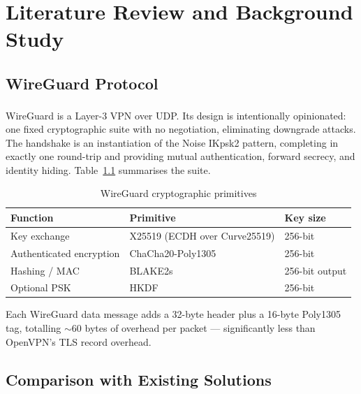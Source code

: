 \documentclass[12pt,a4paper]{report}
\newcommand{\wireguard}{WireGuard\textsuperscript{\textregistered}}
\begin{document}
\chapter{Literature Review and Background Study}

\section{WireGuard Protocol}

\wireguard{} \cite{donenfeld2017wireguard,wireguard_whitepaper} is a Layer-3 VPN over UDP. Its design is intentionally opinionated: one fixed cryptographic suite with no negotiation, eliminating downgrade attacks. The handshake is an instantiation of the Noise IKpsk2 pattern, completing in exactly one round-trip and providing mutual authentication, forward secrecy, and identity hiding. Table~\ref{tab:wg_crypto} summarises the suite.

\begin{table}[H]
\centering\small
\caption{WireGuard cryptographic primitives}
\label{tab:wg_crypto}
\begin{tabular}{lll}
\toprule
\textbf{Function} & \textbf{Primitive} & \textbf{Key size}\\
\midrule
Key exchange & X25519 (ECDH over Curve25519) \cite{bernstein2006curve25519} & 256-bit\\
Authenticated encryption & ChaCha20-Poly1305 & 256-bit\\
Hashing / MAC & BLAKE2s & 256-bit output\\
Optional PSK & HKDF & 256-bit\\
\bottomrule
\end{tabular}
\end{table}

Each WireGuard data message adds a 32-byte header plus a 16-byte Poly1305 tag, totalling $\sim$60 bytes of overhead per packet — significantly less than OpenVPN's TLS record overhead.

\section{Comparison with Existing Solutions}
\end{document}
